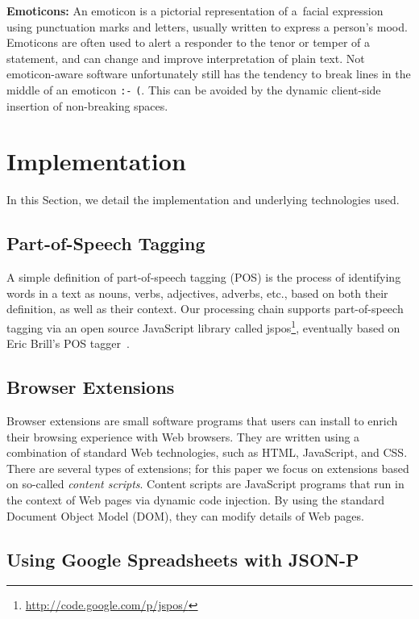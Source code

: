 \documentclass{acm_proc_article-sp}
\let\oldemph\emph
\renewcommand{\emph}[1]{\oldemph{\fontsize{9}{9}\selectfont #1}}
\newcommand{\inlinelistingsize}{\fontsize{8pt}{11pt}}
\let\oldurl\url
\renewcommand{\url}[1]{\inlinelistingsize\oldurl{#1}}
\begin{document}
\textbf{Emoticons:} An emoticon is a pictorial representation of a~facial expression using punctuation marks and letters,
usually written to express a person's mood.
Emoticons are often used to alert a responder to the tenor or temper of a statement,
and can change and improve interpretation of plain text.
Not emoticon-aware software unfortunately still has the tendency to break lines in the middle of an emoticon \texttt{:-} \linebreak %
\texttt{(}. This can be avoided by the dynamic client-side insertion of non-breaking spaces.

\section{Implementation}
In this Section, we detail the implementation and underlying technologies used.

\subsection{Part-of-Speech Tagging}
A simple definition of part-of-speech tagging (POS) is the process of identifying words in a text as nouns, verbs, adjectives, adverbs, etc., based on both their definition, as well as their context.
Our processing chain supports part-of-speech tagging via an open source JavaScript library called jspos\footnote{\url{http://code.google.com/p/jspos/}},
eventually based on Eric Brill's POS tagger~\cite{brill1992simple}.

\subsection{Browser Extensions}
Browser extensions are small software programs that users can install to enrich their browsing experience with Web browsers.
They are written using a combination of standard Web technologies, such as HTML, JavaScript, and CSS.
There are several types of extensions; for this paper we focus on extensions based on so-called \emph{content scripts}.
Content scripts are JavaScript programs that run in the context of Web pages via dynamic code injection.
By using the standard Document Object Model (DOM), they can modify details of Web pages.

\subsection{Using Google Spreadsheets with JSON-P}
\cite{jsonp2009}
\end{document}
